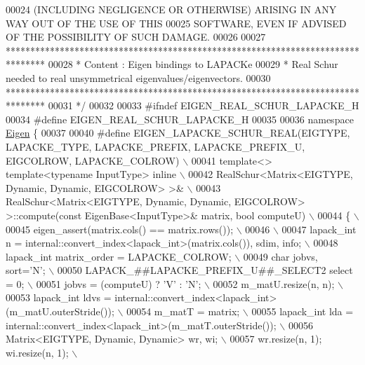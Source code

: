 \begin{DoxyCode}
00024 \textcolor{comment}{ (INCLUDING NEGLIGENCE OR OTHERWISE) ARISING IN ANY WAY OUT OF THE USE OF THIS}
00025 \textcolor{comment}{ SOFTWARE, EVEN IF ADVISED OF THE POSSIBILITY OF SUCH DAMAGE.}
00026 \textcolor{comment}{}
00027 \textcolor{comment}{ ********************************************************************************}
00028 \textcolor{comment}{ *   Content : Eigen bindings to LAPACKe}
00029 \textcolor{comment}{ *    Real Schur needed to real unsymmetrical eigenvalues/eigenvectors.}
00030 \textcolor{comment}{ ********************************************************************************}
00031 \textcolor{comment}{*/}
00032 
00033 \textcolor{preprocessor}{#ifndef EIGEN\_REAL\_SCHUR\_LAPACKE\_H}
00034 \textcolor{preprocessor}{#define EIGEN\_REAL\_SCHUR\_LAPACKE\_H}
00035 
00036 \textcolor{keyword}{namespace }\hyperlink{namespace_eigen}{Eigen} \{ 
00037 
00040 \textcolor{preprocessor}{#define EIGEN\_LAPACKE\_SCHUR\_REAL(EIGTYPE, LAPACKE\_TYPE, LAPACKE\_PREFIX, LAPACKE\_PREFIX\_U, EIGCOLROW,
       LAPACKE\_COLROW) \(\backslash\)}
00041 \textcolor{preprocessor}{template<> template<typename InputType> inline \(\backslash\)}
00042 \textcolor{preprocessor}{RealSchur<Matrix<EIGTYPE, Dynamic, Dynamic, EIGCOLROW> >& \(\backslash\)}
00043 \textcolor{preprocessor}{RealSchur<Matrix<EIGTYPE, Dynamic, Dynamic, EIGCOLROW> >::compute(const EigenBase<InputType>& matrix, bool
       computeU) \(\backslash\)}
00044 \textcolor{preprocessor}{\{ \(\backslash\)}
00045 \textcolor{preprocessor}{  eigen\_assert(matrix.cols() == matrix.rows()); \(\backslash\)}
00046 \textcolor{preprocessor}{\(\backslash\)}
00047 \textcolor{preprocessor}{  lapack\_int n = internal::convert\_index<lapack\_int>(matrix.cols()), sdim, info; \(\backslash\)}
00048 \textcolor{preprocessor}{  lapack\_int matrix\_order = LAPACKE\_COLROW; \(\backslash\)}
00049 \textcolor{preprocessor}{  char jobvs, sort='N'; \(\backslash\)}
00050 \textcolor{preprocessor}{  LAPACK\_##LAPACKE\_PREFIX\_U##\_SELECT2 select = 0; \(\backslash\)}
00051 \textcolor{preprocessor}{  jobvs = (computeU) ? 'V' : 'N'; \(\backslash\)}
00052 \textcolor{preprocessor}{  m\_matU.resize(n, n); \(\backslash\)}
00053 \textcolor{preprocessor}{  lapack\_int ldvs  = internal::convert\_index<lapack\_int>(m\_matU.outerStride()); \(\backslash\)}
00054 \textcolor{preprocessor}{  m\_matT = matrix; \(\backslash\)}
00055 \textcolor{preprocessor}{  lapack\_int lda = internal::convert\_index<lapack\_int>(m\_matT.outerStride()); \(\backslash\)}
00056 \textcolor{preprocessor}{  Matrix<EIGTYPE, Dynamic, Dynamic> wr, wi; \(\backslash\)}
00057 \textcolor{preprocessor}{  wr.resize(n, 1); wi.resize(n, 1); \(\backslash\)}

\end{DoxyCode}
